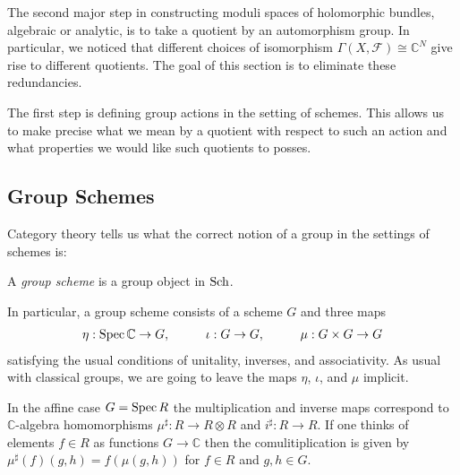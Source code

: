 \documentclass[12pt]{ociamthesis}  %
\begin{document}
The second major step in constructing moduli spaces of holomorphic
bundles, algebraic or analytic, is to take a quotient by an automorphism
group. In particular, we noticed that different choices of isomorphism
$\Gamma(X,\mathscr F)\cong\mathbb{C}^N$ give rise to different quotients.
The goal of this section is to eliminate these redundancies.

The first step is defining group actions in the setting of schemes.
This allows us to make precise what we mean by a quotient with
respect to such an action and what properties we would like such
quotients to posses.

\subsection{Group Schemes}

Category theory tells us what the correct notion of a group in the
settings of schemes is:

\begin{definition}
  A \emph{group scheme} is a group object in $\operatorname{Sch}$.
\end{definition}
In particular, a group scheme consists of a scheme $G$ and three maps
\begin{align}\label{eq:group_maps}
  \eta:\operatorname{Spec}\mathbb{C}\to G,\hspace{1cm}
  \iota:G\to G,\hspace{1cm}
  \mu:G\times G\to G
\end{align}
satisfying the usual conditions of unitality, inverses, and associativity.
As usual with classical groups, we are going to leave the maps
$\eta$, $\iota$, and $\mu$ implicit.

In the affine case $G = \operatorname{Spec} R$ the multiplication and inverse maps
correspond to $\mathbb{C}$-algebra homomorphisms
$\mu^\sharp : R \to R\otimes R$ and $i^\sharp : R\to R$.
If one thinks of elements $f\in R$ as functions $G\to\mathbb C$
then the comulitiplication is given by $\mu^\sharp(f)(g,h) = f(\mu(g,h))$
for $f\in R$ and $g,h\in G$.
\end{document}
